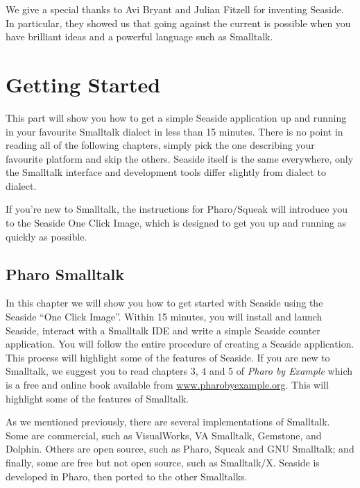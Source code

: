 \documentclass[a4paper,10pt,twoside]{book}
\begin{document}
We give a special thanks to Avi Bryant and Julian Fitzell for inventing Seaside. In particular, they showed us that going against the current is possible when you have brilliant ideas and a powerful language such as Smalltalk.

\part{Getting Started}
\label{book:gettingstarted}

This part will show you how to get a simple Seaside application up and running in your favourite Smalltalk dialect in less than 15 minutes. There is no point in reading all of the following chapters, simply pick the one describing your favourite platform and skip the others. Seaside itself is the same everywhere, only the Smalltalk interface and development tools differ slightly from dialect to dialect.

If you're new to Smalltalk, the instructions for Pharo$/$Squeak will introduce you to the Seaside One Click Image, which is designed to get you up and running as quickly as possible.

\chapter{Pharo Smalltalk}
\label{book:gettingstarted:pharo}

In this chapter we will show you how to get started with Seaside using the Seaside ``One Click Image''. Within 15 minutes, you will install and launch Seaside, interact with a Smalltalk IDE and write a simple Seaside counter application. You will follow the entire procedure of creating a Seaside application. This process will highlight some of the features of Seaside. If you are new to Smalltalk, we suggest you to read chapters 3, 4 and 5 of \textit{Pharo by Example} which is a free and online book available from \href{http://www.pharobyexample.org/}{www.pharobyexample.org}. This will highlight some of the features of Smalltalk.

As we mentioned previously, there are several implementations of Smalltalk. Some are commercial, such as VisualWorks, VA Smalltalk, Gemstone, and Dolphin. Others are open source, such as Pharo, Squeak and GNU Smalltalk; and finally, some are free but not open source, such as Smalltalk$/$X. Seaside is developed in Pharo, then ported to the other Smalltalks.

\end{document}
